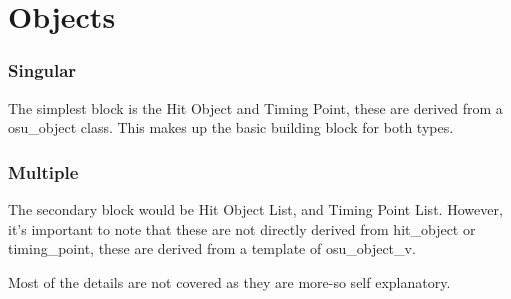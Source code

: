 \part{Objects}

\section{Singular}

The simplest block is the Hit Object and Timing Point, these are derived from a osu\_object class.
This makes up the basic building block for both types.

\section{Multiple}

The secondary block would be Hit Object List, and Timing Point List. However, it's important to note that these are not directly derived from hit\_object or timing\_point, these are derived from a template of osu\_object\_v.

Most of the details are not covered as they are more-so self explanatory.

